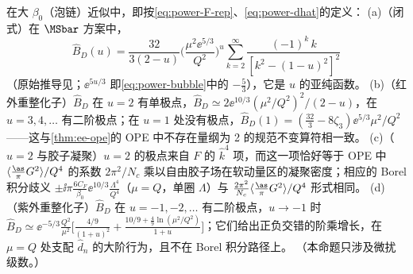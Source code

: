 \begin{proposition}\label{prop:power-adler-large-beta0}
在大 $\beta_0$（泡链）近似中，即按\eqref{eq:power-F-rep}、\eqref{eq:power-dhat}的定义：
(a)（闭式）在 $\MSbar$ 方案中，
\begin{equation}\label{eq:power-adler-borel}
\hat B_D(u)=\frac{32}{3(2-u)}\Big(\frac{\mu^2\ee^{5/3}}{Q^2}\Big)^{u}\sum_{k=2}^\infty\frac{(-1)^k\,k}{[k^2-(1-u)^2]^2}
\end{equation}
\cite[式~(5.10)]{Beneke1999}（原始推导见\cite{Beneke1993,Broadhurst1993}；$\ee^{5u/3}$ 即\eqref{eq:power-bubble}中的 $-\frac53$），它是 $u$ 的亚纯函数。
(b)（红外重整化子）$\hat B_D$ 在 $u=2$ 有单极点，$\hat B_D\simeq2\ee^{10/3}(\mu^2/Q^2)^2/(2-u)$，在 $u=3,4,\dots$ 有二阶极点；在 $u=1$ 处没有极点，$\hat B_D(1)=(\frac{32}{3}-8\zeta_3)\ee^{5/3}\mu^2/Q^2$——这与\cref{thm:ee-ope}的 OPE 中不存在量纲为 2 的规范不变算符相一致。
(c)（$u=2$ 与胶子凝聚）$u=2$ 的极点来自 $F$ 的 $\hat k^4$ 项，而这一项恰好等于 OPE 中 $\langle\frac{\as}{\pi}G^2\rangle/Q^4$ 的系数 $2\pi^2/N_c$ 乘以自由胶子场在软动量区的凝聚密度；相应的 Borel 积分歧义 $\pm\ii\pi\frac{6C_F}{\beta_0}\ee^{10/3}\frac{\Lambda^4}{Q^4}$（$\mu=Q$，单圈 $\Lambda$）与 $\frac{2\pi^2}{N_c}\langle\frac{\as}{\pi}G^2\rangle/Q^4$ 形式相同。
(d)（紫外重整化子）$\hat B_D$ 在 $u=-1,-2,\dots$ 有二阶极点，$u\to-1$ 时 $\hat B_D\simeq\ee^{-5/3}\frac{Q^2}{\mu^2}\big[\frac{4/9}{(1+u)^2}+\frac{10/9+\frac49\ln(\mu^2/Q^2)}{1+u}\big]$；它们给出正负交错的阶乘增长，在 $\mu=Q$ 处支配 $\hat d_n$ 的大阶行为，且不在 Borel 积分路径上。
（本命题只涉及微扰级数。）
\end{proposition}

